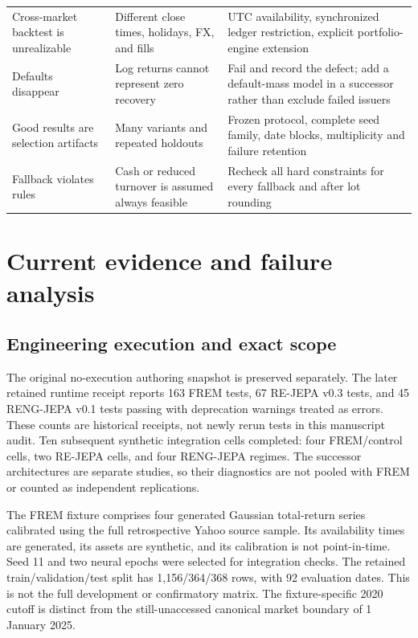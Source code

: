 \documentclass[11pt,a4paper]{article}
\begin{document}
\begin{longtable}{>{\raggedright\arraybackslash}p{.23\linewidth}>{\raggedright\arraybackslash}p{.31\linewidth}>{\raggedright\arraybackslash}p{.37\linewidth}}
Cross-market backtest is unrealizable & Different close times, holidays, FX, and fills & UTC availability, synchronized ledger restriction, explicit portfolio-engine extension \\
Defaults disappear & Log returns cannot represent zero recovery & Fail and record the defect; add a default-mass model in a successor rather than exclude failed issuers \\
Good results are selection artifacts & Many variants and repeated holdouts & Frozen protocol, complete seed family, date blocks, multiplicity and failure retention \\
Fallback violates rules & Cash or reduced turnover is assumed always feasible & Recheck all hard constraints for every fallback and after lot rounding \\
\bottomrule
\end{longtable}

\section{Current evidence and failure analysis}
\label{sec:evidence}

\subsection{Engineering execution and exact scope}
The original no-execution authoring snapshot is preserved separately. The later retained runtime receipt reports 163 FREM tests, 67 RE-JEPA v0.3 tests, and 45 RENG-JEPA v0.1 tests passing with deprecation warnings treated as errors. These counts are historical receipts, not newly rerun tests in this manuscript audit. Ten subsequent synthetic integration cells completed: four FREM/control cells, two RE-JEPA cells, and four RENG-JEPA regimes. The successor architectures are separate studies, so their diagnostics are not pooled with FREM or counted as independent replications.

The FREM fixture comprises four generated Gaussian total-return series calibrated using the full retrospective Yahoo source sample. Its availability times are generated, its assets are synthetic, and its calibration is not point-in-time. Seed 11 and two neural epochs were selected for integration checks. The retained train/validation/test split has 1,156/364/368 rows, with 92 evaluation dates. This is not the full development or confirmatory matrix. The fixture-specific 2020 cutoff is distinct from the still-unaccessed canonical market boundary of 1 January 2025.
\end{document}
